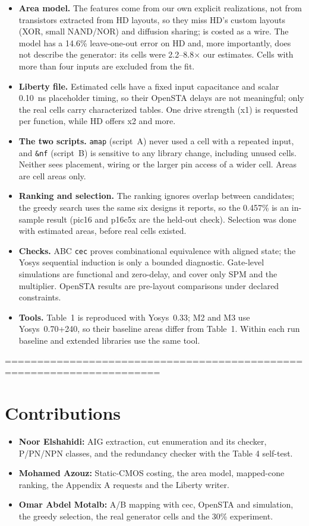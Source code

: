 \documentclass[10pt,a4paper]{article}
\newcommand{\cell}[1]{\texttt{\detokenize{#1}}}
\begin{document}
\begin{itemize}
\item \textbf{Area model.} The features come from our own explicit realizations, not from transistors
extracted from HD layouts, so they miss HD's custom layouts (XOR, small NAND/NOR) and diffusion sharing;
\cell{buf_1} is costed as a wire. The model has a 14.6\% leave-one-out error on HD and, more importantly, does
not describe the generator: its cells were 2.2--8.8$\times$ our estimates. Cells with more than four inputs are
excluded from the fit.
\item \textbf{Liberty file.} Estimated cells have a fixed input capacitance and scalar 0.10~ns placeholder
timing, so their OpenSTA delays are not meaningful; only the real cells carry characterized tables. One drive
strength (x1) is requested per function, while HD offers x2 and more.
\item \textbf{The two scripts.} \texttt{amap} (script~A) never used a cell with a repeated input, and
\texttt{\&nf} (script~B) is sensitive to any library change, including unused cells. Neither sees placement,
wiring or the larger pin access of a wider cell. Areas are cell areas only.
\item \textbf{Ranking and selection.} The ranking ignores overlap between candidates; the greedy search uses
the same six designs it reports, so the 0.457\% is an in-sample result (pic16 and p16c5x are the held-out check).
Selection was done with estimated areas, before real cells existed.
\item \textbf{Checks.} ABC \texttt{cec} proves combinational equivalence with aligned state; the Yosys
sequential induction is only a bounded diagnostic. Gate-level simulations are functional and zero-delay, and
cover only SPM and the multiplier. OpenSTA results are pre-layout comparisons under declared constraints.
\item \textbf{Tools.} Table~1 is reproduced with Yosys~0.33; M2 and M3 use Yosys~0.70+240, so their baseline
areas differ from Table~1. Within each run baseline and extended libraries use the same tool.
\end{itemize}

======================================================================
\section{Contributions}
\begin{itemize}
\item \textbf{Noor Elshahidi:} AIG extraction, cut enumeration and its checker, P/PN/NPN classes, and the redundancy checker with the Table 4 self-test.
\item \textbf{Mohamed Azouz:} Static-CMOS costing, the area model, mapped-cone ranking, the Appendix A requests and the Liberty writer.
\item \textbf{Omar Abdel Motalb:} A/B mapping with cec, OpenSTA and simulation, the greedy selection, the real generator cells and the 30\% experiment.
\end{itemize}
\end{document}

